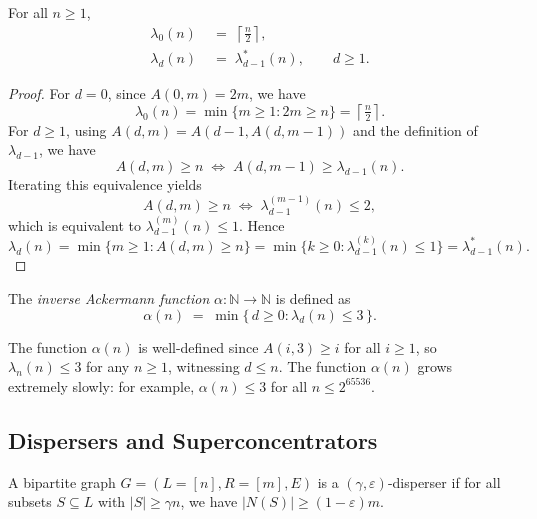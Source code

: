 \documentclass[11pt]{article}
\theoremstyle{named}
\begin{document}
\begin{proposition}
\label{prop:lambda-closed-form}
For all $n \ge 1$,
\begin{align*}
    \lambda_0(n) &\;=\; \left\lceil \frac{n}{2} \right\rceil,  \\
    \lambda_d(n) &\;=\; \lambda^*_{d-1}(n), \qquad d \ge 1.   
\end{align*}
\end{proposition}
\begin{proof}
For $d=0$, since $A(0,m)=2m$, we have
\[
\lambda_0(n)=\min\{m\ge1:2m\ge n\}=\left\lceil \tfrac{n}{2}\right\rceil.
\]
For $d\ge1$, using $A(d,m)=A(d-1,A(d,m-1))$ and the definition of $\lambda_{d-1}$, we have
\[
A(d,m)\ge n
\;\Longleftrightarrow\;
A(d,m-1)\ge \lambda_{d-1}(n).
\]
Iterating this equivalence yields
\[
A(d,m)\ge n
\;\Longleftrightarrow\;
\lambda_{d-1}^{(m-1)}(n)\le 2,
\]
which is equivalent to $\lambda_{d-1}^{(m)}(n)\le 1$. Hence
\[
\lambda_d(n)=\min\{m\ge1:A(d,m)\ge n\}
=\min\{k\ge0:\lambda_{d-1}^{(k)}(n)\le1\}
=\lambda_{d-1}^*(n).
\]
\end{proof}


\begin{definition}
\label{def:alpha}
The \emph{inverse Ackermann function} $\alpha : \mathbb{N} \to \mathbb{N}$ is defined as
\begin{equation}
    \alpha(n) \;=\; \min\bigl\{\, d \ge 0 : \lambda_d(n) \le 3 \,\bigr\}.
\end{equation}
\end{definition}


The function $\alpha(n)$ is well-defined since $A(i, 3) \ge i$ for all $i \ge 1$, so $\lambda_n(n) \le 3$ for any $n \ge 1$, witnessing $d \le n$. The function $\alpha(n)$ grows extremely slowly: for example, $\alpha(n) \le 3$ for all $n \le 2^{65536}$.









\subsection{Dispersers and Superconcentrators}


\begin{definition} \cite{guruswami2012essential} A bipartite graph $G = (L = [n], R = [m], E)$ is a $(\gamma, \varepsilon)$-disperser if for all subsets $S \subseteq L$ with $|S| \ge \gamma n$, we have $|N(S)| \ge (1 - \varepsilon)m$.
\end{definition}
\end{document}
